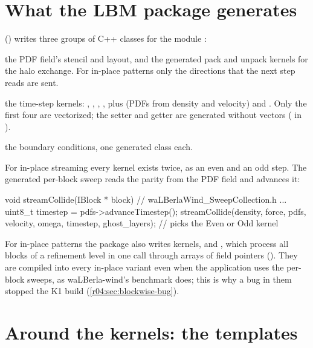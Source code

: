 \section{What the LBM package generates}

 () writes
three groups of C++ classes for the module :
\begin{description}[style=nextline]
  \item[StorageSpecification] the PDF field's stencil and layout, and the generated
    pack and unpack kernels for the halo exchange. For in-place patterns only the
    directions that the next step reads are sent.
  \item[SweepCollection] the time-step kernels: , ,
    , , plus  (PDFs from
    density and velocity) and . Only the first four
    are vectorized; the setter and getter are generated without vectors
    ( in ).
  \item[BoundaryCollection] the boundary conditions, one generated class each.
\end{description}
For in-place streaming every kernel exists twice, as an even and an odd step. The
generated per-block sweep reads the parity from the PDF field and advances it:
\begin{ccode}
void streamCollide(IBlock * block) {                       // waLBerlaWind_SweepCollection.h
   ...
   uint8_t timestep = pdfs->advanceTimestep();
   streamCollide(density, force, pdfs, velocity, omega, timestep, ghost_layers);
}                                                          // picks the Even or Odd kernel
\end{ccode}
For in-place patterns the package also writes  kernels,
 and , which process all blocks of
a refinement level in one call through arrays of field pointers
(). They are compiled into every in-place variant even when the
application uses the per-block sweeps, as waLBerla-wind's benchmark does; this is why a
bug in them stopped the K1 build (\cref{r04:sec:blockwise-bug}).

\section{Around the kernels: the templates}

